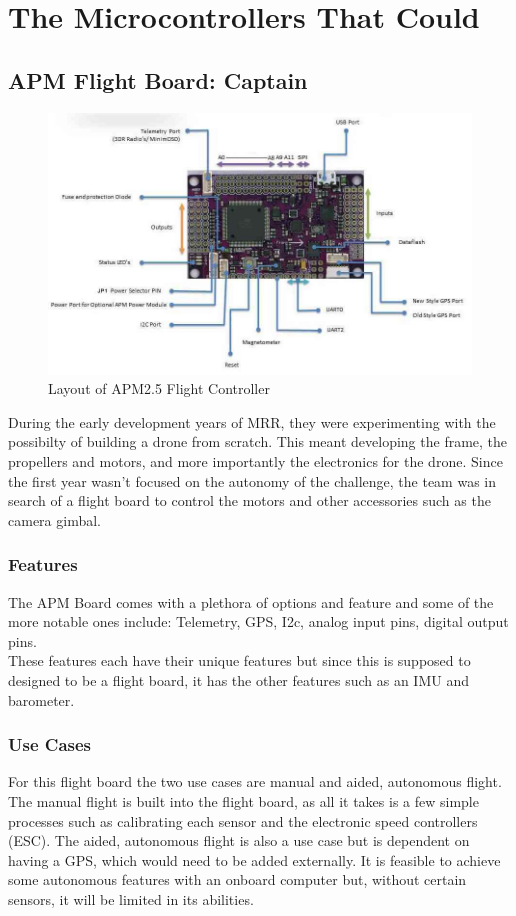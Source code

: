 \documentclass[conference,12pt, ]{IEEEtran}
\begin{document}
\section{The Microcontrollers That Could}
\subsection{APM Flight Board: Captain}
\begin{figure}
	\includegraphics[scale=0.40]{apm2.jpg}
	\caption {Layout of APM2.5 Flight Controller}
\end{figure}
During the early development years of MRR, they were experimenting with the possibilty of building a drone from scratch. This meant developing the frame, the propellers and motors, and more importantly the electronics for the drone. Since the first year wasn't focused on the autonomy of the challenge, the team was in search of a flight board to control the motors and other accessories such as the camera gimbal. 

\subsubsection{Features}
The APM Board comes with a plethora of options and feature and some of the more notable ones include: Telemetry, GPS, I2c, analog input pins, digital output pins. \cite{apm_board}\\
These features each have their unique features but since this is supposed to designed to be a flight board, it has the other features such as an IMU and barometer. 

\subsubsection{Use Cases}
For this flight board the two use cases are manual and aided, autonomous flight. The manual flight is built into the flight board, as all it takes is a few simple processes such as calibrating each sensor and the electronic speed controllers (ESC). The aided, autonomous flight is also a use case but is dependent on having a GPS, which would need to be added externally. It is feasible to achieve some autonomous features with an onboard computer but, without certain sensors, it will be limited in its abilities. 
\end{document}
